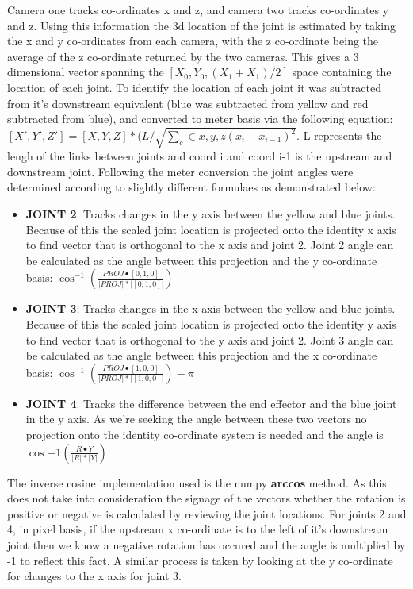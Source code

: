 \documentclass[./writeup.tex]{subfiles}
\begin{document}
Camera one tracks co-ordinates x and z, and camera two tracks co-ordinates y and z. Using this information the 3d location of the joint is estimated by taking the x and y co-ordinates from each camera, with the z co-ordinate being the average of the z co-ordinate returned by the two cameras. This gives a 3 dimensional vector spanning the $[X_0, Y_0, (X_1 + X_1)/2]$ space containing the location of each joint.
\newline
\newline
To identify the location of each joint it was subtracted from it's downstream equivalent (blue was subtracted from yellow and red subtracted from blue), and converted to meter basis via the following equation: $[X', Y', Z'] = [X, Y, Z] * (L / \sqrt{\sum_c \in {x, y, z} (x_i -  x_{i-1})^{2}}$. L represents the lengh of the links between joints and coord i and coord i-1 is the upstream and downstream joint. Following the meter conversion the joint angles were determined according to slightly different formulaes as demonstrated below:
\begin{itemize}
    \item \textbf{JOINT 2}: Tracks changes in the y axis between the yellow and blue joints. Because of this the scaled joint location is projected onto the identity x axis to find vector that is orthogonal to the x axis and joint 2. Joint 2 angle can be calculated as the angle between this projection and the y co-ordinate basis: $\cos^{-1} (\frac{PROJ \bullet [0, 1, 0]}{|PROJ| * |[0, 1, 0]|})$
    \item \textbf{JOINT 3}: Tracks changes in the x axis between the yellow and blue joints. Because of this the scaled joint location is projected onto the identity y axis to find vector that is orthogonal to the y axis and joint 2. Joint 3 angle can be calculated as the angle between this projection and the x co-ordinate basis: $\cos^{-1} (\frac{PROJ \bullet [1, 0, 0]}{|PROJ| * |[1, 0, 0]|}) - \pi$
    \item \textbf{JOINT 4}. Tracks the difference between the end effector and the blue joint in the y axis. As we're seeking the angle between these two vectors no projection onto the identity co-ordinate system is needed and the angle is $\cos{-1}(\frac{R \bullet Y}{|R| * |Y|})$
\end{itemize}
The inverse cosine implementation used is the numpy \textbf{arccos} method. As this does not take into consideration the signage of the vectors whether the rotation is positive or negative is calculated by reviewing the joint locations. For joints 2 and 4, in pixel basis, if the upstream x co-ordinate is to the left of it's downstream joint then we know a negative rotation has occured and the angle is multiplied by -1 to reflect this fact. A similar process is taken by looking at the y co-ordinate for changes to the x axis for joint 3.
\end{document}
